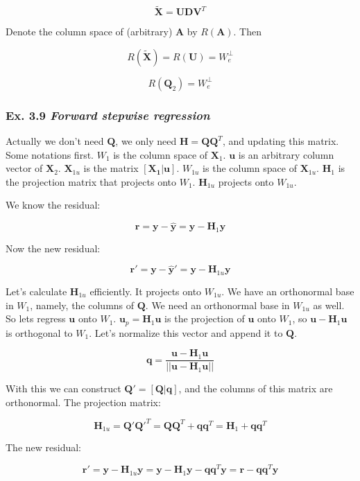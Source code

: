 \documentclass{article}
\begin{document}
\[
\tilde{\bm{X}} = \bm{U} \bm{D} \bm{V}^{T}
\]

Denote the column space of (arbitrary) $\bm{A}$ by $R(\bm{A})$. Then

\[
R(\tilde{\bm{X}}) = R(\bm{U}) = W_e^{\perp}
\]

\[
R(\bm{Q}_2) = W_e^{\perp}
\]


\subsubsection{Ex. 3.9 \emph{Forward stepwise regression}}

Actually we don't need $\mathbf{Q}$, we only need $\mathbf{H}= \mathbf{Q}\mathbf{Q}^T$, and updating this matrix. Some notations first. $W_1$ is the column space of $\mathbf{X}_1$. $\mathbf{u}$ is an arbitrary column vector of $\mathbf{X}_2$. $\mathbf{X}_{1u}$ is the matrix $[\mathbf{X_1} | \mathbf{u}]$. $W_{1u}$ is the column space of $\mathbf{X}_{1u}$. $\mathbf{H}_1$ is the projection matrix that projects onto $W_1$. $\mathbf{H}_{1u}$ projects onto $W_{1u}$.

We know the residual:

\[
\mathbf{r} = \mathbf{y} - \mathbf{\hat{y}} = \mathbf{y} - \mathbf{H}_1 \mathbf{y}
\]

Now the new residual:

\[
\mathbf{r}'  = \mathbf{y} - \mathbf{\hat{y}}' = \mathbf{y} - \mathbf{H}_{1u}\mathbf{y}
\]

Let's calculate $\mathbf{H}_{1u}$ efficiently. It projects onto $W_{1u}$. We have an orthonormal base in $W_1$, namely, the columns of $\mathbf{Q}$. We need an orthonormal base in $W_{1u}$ as well. So lets regress $\mathbf{u}$ onto $W_1$. $\mathbf{u}_p = \mathbf{H}_1 \mathbf{u}$ is the projection of $\mathbf{u}$ onto $W_1$, so $\mathbf{u} - \mathbf{H}_1 \mathbf{u}$ is orthogonal to $W_1$. Let's normalize this vector and append it to $\mathbf{Q}$.

\[
    \mathbf{q} = \frac{\mathbf{u} - \mathbf{H}_1 \mathbf{u}}{|| \mathbf{u} - \mathbf{H}_1 \mathbf{u} ||}
\]

With this we can construct $\mathbf{Q}' = [\mathbf{Q} | \mathbf{q}]$, and the columns of this matrix are orthonormal. The projection matrix:

\[
\mathbf{H}_{1u} = \mathbf{Q}'\mathbf{Q}'^T = \mathbf{Q}\mathbf{Q}^T + \mathbf{q}\mathbf{q}^T = \mathbf{H}_1 + \mathbf{q}\mathbf{q}^T
\]

The new residual:

\[
\mathbf{r}' = \mathbf{y} - \mathbf{H}_{1u}\mathbf{y} = \mathbf{y} - \mathbf{H}_1 \mathbf{y} - \mathbf{q}\mathbf{q}^T\mathbf{y} = \mathbf{r} - \mathbf{q}\mathbf{q}^T\mathbf{y}
\]
\end{document}
